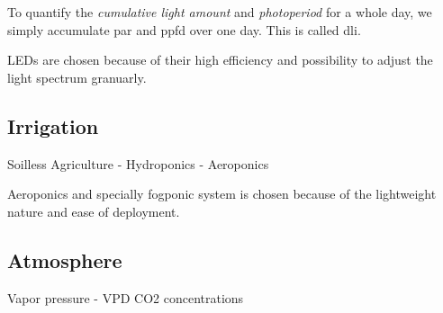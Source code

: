 To quantify the \textit{cumulative light amount} and \textit{photoperiod} for a whole day, we simply accumulate \ac{par} and \ac{ppfd} over one day.
This is called \ac{dli}.

LEDs are chosen because of their high efficiency and possibility to adjust the light spectrum granuarly.

\subsection{Irrigation}
Soilless Agriculture - Hydroponics - Aeroponics

Aeroponics and specially fogponic system is chosen because of the lightweight nature and ease of deployment.

\subsection{Atmosphere}
Vapor pressure - VPD
CO2 concentrations


